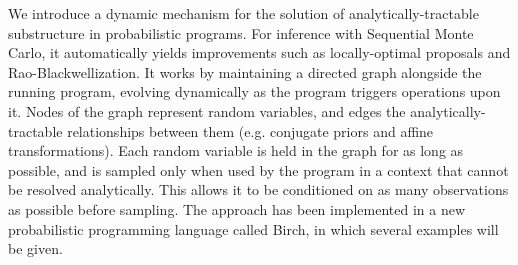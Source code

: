 We introduce a dynamic mechanism for the solution of analytically-tractable substructure in probabilistic programs. For inference with
Sequential Monte Carlo, it automatically yields improvements such as
locally-optimal proposals and Rao-Blackwellization. It works by
maintaining a directed graph alongside the running program,
evolving dynamically as the program triggers operations upon it.
Nodes of the graph represent random variables, and edges the
analytically-tractable relationships between them (e.g. conjugate
priors and affine transformations). Each random variable is held in the
graph for as long as possible, and is sampled only when used by the
program in a context that cannot be resolved analytically. This allows
it to be conditioned on as many observations as possible before sampling. The approach has been implemented in a new probabilistic
programming language called Birch, in which several examples will be
given.